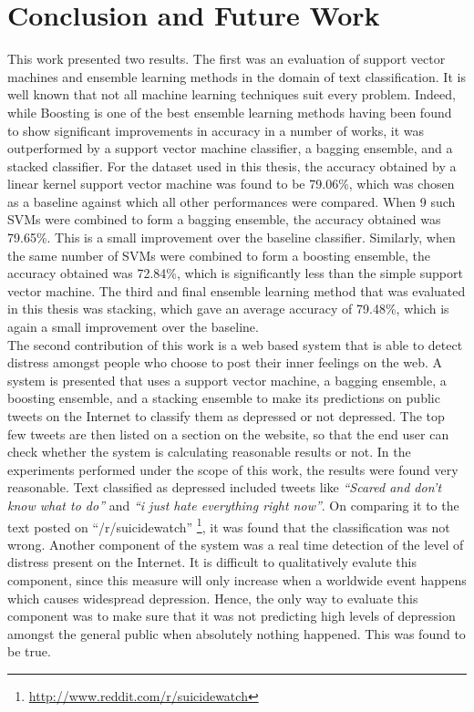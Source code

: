 \chapter{Conclusion and Future Work}
\label{chapter:Conclusion}

This work presented two results. The first was an evaluation of support vector machines and ensemble learning methods in the domain of text classification. It is well known that not all machine learning techniques suit every problem. Indeed, while Boosting is one of the best ensemble learning methods having been found to show significant improvements in accuracy in a number of works, it was outperformed by a support vector machine classifier, a bagging ensemble, and a stacked classifier. For the dataset used in this thesis, the accuracy obtained by a linear kernel support vector machine was found to be 79.06\%, which was chosen as a baseline against which all other performances were compared. When 9 such SVMs were combined to form a bagging ensemble, the accuracy obtained was 79.65\%. This is a small improvement over the baseline classifier. Similarly, when the same number of SVMs were combined to form a boosting ensemble, the accuracy obtained was 72.84\%, which is significantly less than the simple support vector machine. The third and final ensemble learning method that was evaluated in this thesis was stacking, which gave an average accuracy of 79.48\%, which is again a small improvement over the baseline.\\

The second contribution of this work is a web based system that is able to detect distress amongst people who choose to post their inner feelings on the web. A system is presented that uses a support vector machine, a bagging ensemble, a boosting ensemble, and a stacking ensemble to make its predictions on public tweets on the Internet to classify them as depressed or not depressed. The top few tweets are then listed on a section on the website, so that the end user can check whether the system is calculating reasonable results or not. In the experiments performed under the scope of this work, the results were found very reasonable. Text classified as depressed included tweets like \emph{``Scared and don't know what to do''} and \emph{``i just hate everything right now''}. On comparing it to the text posted on ``/r/suicidewatch'' \footnote{\url{http://www.reddit.com/r/suicidewatch}}, it was found that the classification was not wrong. Another component of the system was a real time detection of the level of distress present on the Internet. It is difficult to qualitatively evalute this component, since this measure will only increase when a worldwide event happens which causes widespread depression. Hence, the only way to evaluate this component was to make sure that it was not predicting high levels of depression amongst the general public when absolutely nothing happened. This was found to be true.\\

